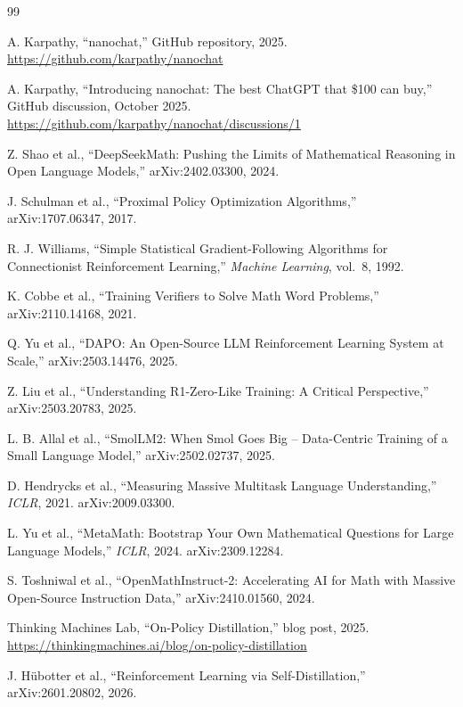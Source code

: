\documentclass[11pt]{article}
\begin{document}
\begin{thebibliography}{99}

A. Karpathy, ``nanochat,'' GitHub repository, 2025. \url{https://github.com/karpathy/nanochat}

A. Karpathy, ``Introducing nanochat: The best ChatGPT that \$100 can buy,'' GitHub discussion, October 2025. \url{https://github.com/karpathy/nanochat/discussions/1}

Z. Shao et al., ``DeepSeekMath: Pushing the Limits of Mathematical Reasoning in Open Language Models,'' arXiv:2402.03300, 2024.

J. Schulman et al., ``Proximal Policy Optimization Algorithms,'' arXiv:1707.06347, 2017.

R. J. Williams, ``Simple Statistical Gradient-Following Algorithms for Connectionist Reinforcement Learning,'' \textit{Machine Learning}, vol.~8, 1992.

K. Cobbe et al., ``Training Verifiers to Solve Math Word Problems,'' arXiv:2110.14168, 2021.

Q. Yu et al., ``DAPO: An Open-Source LLM Reinforcement Learning System at Scale,'' arXiv:2503.14476, 2025.

Z. Liu et al., ``Understanding R1-Zero-Like Training: A Critical Perspective,'' arXiv:2503.20783, 2025.

L. B. Allal et al., ``SmolLM2: When Smol Goes Big -- Data-Centric Training of a Small Language Model,'' arXiv:2502.02737, 2025.

D. Hendrycks et al., ``Measuring Massive Multitask Language Understanding,'' \textit{ICLR}, 2021. arXiv:2009.03300.

L. Yu et al., ``MetaMath: Bootstrap Your Own Mathematical Questions for Large Language Models,'' \textit{ICLR}, 2024. arXiv:2309.12284.

S. Toshniwal et al., ``OpenMathInstruct-2: Accelerating AI for Math with Massive Open-Source Instruction Data,'' arXiv:2410.01560, 2024.

Thinking Machines Lab, ``On-Policy Distillation,'' blog post, 2025. \url{https://thinkingmachines.ai/blog/on-policy-distillation}

J. H\"ubotter et al., ``Reinforcement Learning via Self-Distillation,'' arXiv:2601.20802, 2026.

\end{thebibliography}
\end{document}
